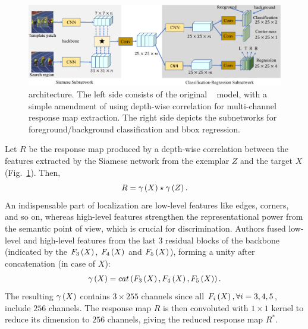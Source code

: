 \begin{figure}[t]
    \centerline{\includegraphics[width=\linewidth]{figures/theoretical_foundations/siamcar_architecture.pdf}}
    \caption[ architecture]{ architecture. The left side consists of the original ~\cite{bertinetto2016siamfc} model, with a simple amendment of using depth-wise correlation for multi-channel response map extraction. The right side depicts the subnetworks for foreground/background classification and \gls{bbox} regression. }
    \label{fig:SiamCARArchitecture}
\end{figure}

Let $R$ be the response map produced by a depth-wise correlation between the features extracted by the Siamese network from the exemplar $Z$ and the target $X$ (Fig.~\ref{fig:SiamCARArchitecture}). Then,
\begin{equation}
    R = {\gamma} \left( X \right) \star {\gamma} \left( Z \right).
\end{equation}
An indispensable part of localization are low-level features like edges, corners, and so on, whereas high-level features strengthen the representational power from the semantic point of view, which is crucial for discrimination. Authors fused low-level and high-level features from the last $3$ residual blocks of the  backbone (indicated by the ${F_3} \left( X \right)$, ${F_4} \left( X \right)$ and ${F_5} \left( X \right)$), forming a unity after concatenation (in case of $X$):
\begin{equation}
    {\gamma} \left( X \right) = {cat} \left( {F_3} \left( X \right), {F_4} \left( X \right), {F_5} \left( X \right) \right).
\end{equation}
The resulting ${\gamma} \left( X \right)$ contains $3 \times 255$ channels since all ${F_i} \left( X \right), \forall i = 3, 4, 5$, include $256$ channels. The response map $R$ is then convoluted with $1 \times 1$ kernel to reduce its dimension to $256$ channels, giving the reduced response map $R^*$.

